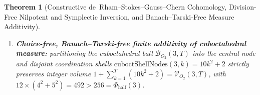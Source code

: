 \documentclass[11pt,a4paper]{article}
\theoremstyle{plain}
\newtheorem{theorem}{Theorem}[section]
\theoremstyle{definition}
\begin{document}
\begin{theorem}[Constructive de~Rham--Stokes--Gauss--Chern Cohomology, Division-Free Nilpotent and Symplectic Inversion, and Banach--Tarski-Free Measure Additivity]
\begin{enumerate}[label=\textbf{(\roman*)},leftmargin=*]
  the symplectic Verlet map $(u,v)\mapsto(2u-v+\Phi,u)$ ($\det = +1\in\mathrm{SL}_2(\mathbb{Z})$) inverts in place via $(u',v')\mapsto(v',2v'-u'+\Phi)$, while the 4D nilpotent operator $\mathcal{M} = I_4 + N_{\mathrm{nil}}$ ($N_{\mathrm{nil}}^3 = 0$, $\det(2\mathcal{M}) = 24$) inverts exactly via the finite 3-term Neumann polynomial $\mathcal{M}^{-1} = I_4 - N_{\mathrm{nil}} + N_{\mathrm{nil}}^2$.
\item \textbf{Choice-free, Banach--Tarski-free finite additivity of cuboctahedral measure:}
  partitioning the cuboctahedral ball $\mathcal{B}_{O_2}(3,T)$ into the central node and disjoint coordination shells $\mathrm{cuboctShellNodes}(3,k) = 10k^2+2$ strictly preserves integer volume $1 + \sum_{k=1}^T(10k^2+2) = \mathcal{V}_{O_2}(3,T)$, with $12\times(4^2+5^2) = 492 > 256 = \Phi_{\mathrm{half}}(3)$.
\end{enumerate}
\end{theorem}
\end{document}
